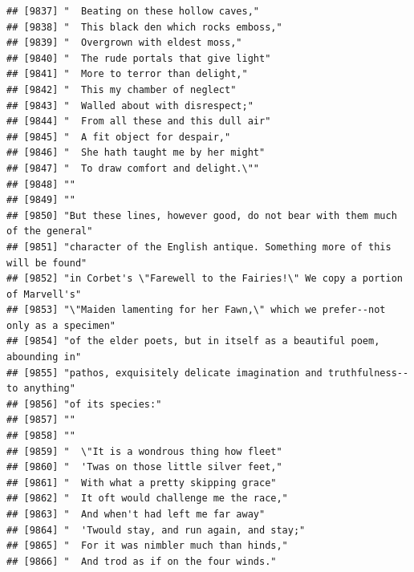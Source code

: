 \documentclass{article}\usepackage[]{graphicx}\usepackage[]{color}
\makeatletter
\newenvironment{kframe}{%
 \def\at@end@of@kframe{}%
 \ifinner\ifhmode%
  \def\at@end@of@kframe{\end{minipage}}%
  \begin{minipage}{\columnwidth}%
 \fi\fi%
 \def\FrameCommand##1{\hskip\@totalleftmargin \hskip-\fboxsep
 \colorbox{shadecolor}{##1}\hskip-\fboxsep
     \hskip-\linewidth \hskip-\@totalleftmargin \hskip\columnwidth}%
 \MakeFramed {\advance\hsize-\width
   \@totalleftmargin\z@ \linewidth\hsize
   \@setminipage}}%
 {\par\unskip\endMakeFramed%
 \at@end@of@kframe}
\newenvironment{knitrout}{}{} %
\makeatother
\begin{document}
\begin{knitrout}
\begin{kframe}
\begin{verbatim}
## [9837] "  Beating on these hollow caves,"                                            
## [9838] "  This black den which rocks emboss,"                                        
## [9839] "  Overgrown with eldest moss,"                                               
## [9840] "  The rude portals that give light"                                          
## [9841] "  More to terror than delight,"                                              
## [9842] "  This my chamber of neglect"                                                
## [9843] "  Walled about with disrespect;"                                             
## [9844] "  From all these and this dull air"                                          
## [9845] "  A fit object for despair,"                                                 
## [9846] "  She hath taught me by her might"                                           
## [9847] "  To draw comfort and delight.\""                                            
## [9848] ""                                                                            
## [9849] ""                                                                            
## [9850] "But these lines, however good, do not bear with them much of the general"    
## [9851] "character of the English antique. Something more of this will be found"      
## [9852] "in Corbet's \"Farewell to the Fairies!\" We copy a portion of Marvell's"     
## [9853] "\"Maiden lamenting for her Fawn,\" which we prefer--not only as a specimen"  
## [9854] "of the elder poets, but in itself as a beautiful poem, abounding in"         
## [9855] "pathos, exquisitely delicate imagination and truthfulness--to anything"      
## [9856] "of its species:"                                                             
## [9857] ""                                                                            
## [9858] ""                                                                            
## [9859] "  \"It is a wondrous thing how fleet"                                        
## [9860] "  'Twas on those little silver feet,"                                        
## [9861] "  With what a pretty skipping grace"                                         
## [9862] "  It oft would challenge me the race,"                                       
## [9863] "  And when't had left me far away"                                           
## [9864] "  'Twould stay, and run again, and stay;"                                    
## [9865] "  For it was nimbler much than hinds,"                                       
## [9866] "  And trod as if on the four winds."                                         

\end{verbatim}
\end{kframe}
\end{knitrout}
\end{document}
